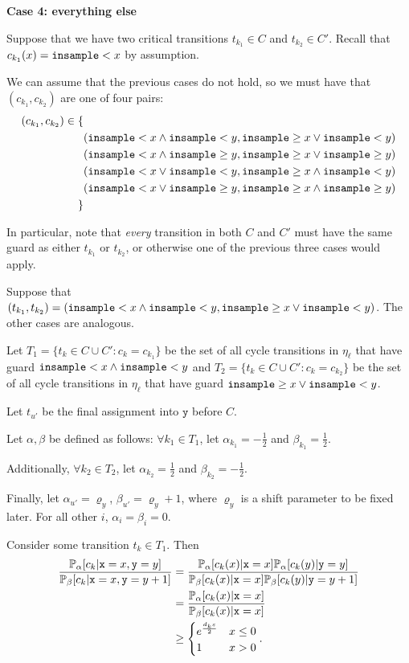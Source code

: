 \textbf{Case 4: everything else}

Suppose that we have two critical transitions $t_{k_1}\in C$ and $t_{k_2}\in C'$. Recall that $c_{k_1}(x) = \lguard[x]$ by assumption. 

We can assume that the previous cases do not hold, so we must have that $(c_{k_1}, c_{k_2})$ are one of four pairs: \begin{align*}
	(c_{k_1}, c_{k_2})\in\{&\\
	&(\lguard[x]\land\lguard[y], \gguard[x]\lor\lguard[y])\\	
	&(\lguard[x]\land\gguard[y], \gguard[x]\lor\gguard[y])\\
	&(\lguard[x]\lor\lguard[y], \gguard[x]\land\lguard[y])\\
	&(\lguard[x]\lor\gguard[y], \gguard[x]\land\gguard[y])\\
	\}&
\end{align*}

In particular, note that \textit{every} transition in both $C$ and $C'$ must have the same guard as either $t_{k_1}$ or $t_{k_2}$, or otherwise one of the previous three cases would apply. 

Suppose that $(t_{k_1}, t_{k_2})=(\lguard[x]\land\lguard[y], \gguard[x]\lor\lguard[y])$. The other cases are analogous.



Let $T_1 = \{t_k\in C\cup C':c_k = c_{k_1}\}$ be the set of all cycle transitions in $\eta_\ell$ that have guard $\lguard[x]\land\lguard[y]$ and $T_2= \{t_k\in C\cup C':c_k = c_{k_2}\}$ be the set of all cycle transitions in $\eta_\ell$ that have guard $\gguard[x]\lor\lguard[y]$.

Let $t_{u'}$ be the final assignment into $\texttt{y}$ before $C$. 

Let $\alpha, \beta$ be defined as follows: $\forall k_1\in T_1$, let $\alpha_{k_1} = -\frac{1}{2}$ and $\beta_{k_1} = \frac{1}{2}$. 

Additionally, $\forall k_2\in T_2$, let $\alpha_{k_2} = \frac{1}{2}$ and $\beta_{k_2} = -\frac{1}{2}$. 

Finally, let $\alpha_{u'} = \varrho_y$, $\beta_{u'}=\varrho_y+1$, where $\varrho_y$ is a shift parameter to be fixed later. For all other $i$, $\alpha_i = \beta_i = 0$.

Consider some transition $t_k \in T_1$. Then \begin{align*}
	\frac{\PP_\alpha[c_k|\texttt{x}=x, \texttt{y}=y]}{\PP_\beta[c_k|\texttt{x}=x, \texttt{y}=y+1]}&=\frac{\PP_\alpha[c_k(x)|\texttt{x}=x]\PP_\alpha[c_k(y)|\texttt{y}=y]}{\PP_\beta[c_k(x)|\texttt{x}=x]\PP_\beta[c_k(y)|\texttt{y}=y+1]}\\
	&= \frac{\PP_\alpha[c_k(x)|\texttt{x}=x]}{\PP_\beta[c_k(x)|\texttt{x}=x]}\\
	&\geq \begin{cases}
		e^{\frac{d_{k}\varepsilon}{2}} & x\leq 0\\
		1 & x> 0
	\end{cases}.
\end{align*}

